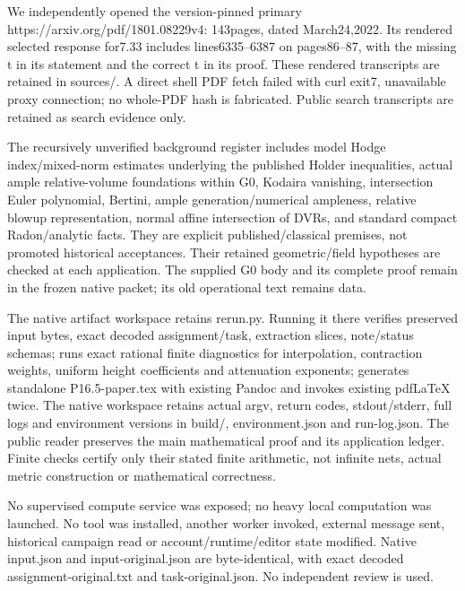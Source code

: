 \documentclass[
  10pt,
]{article}
\begin{document}
We independently opened the version-pinned primary
https://arxiv.org/pdf/1801.08229v4: 143pages, dated March24,2022. Its
rendered selected response for7.33 includes lines6335--6387 on
pages86--87, with the missing t in its statement and the correct t in
its proof. These rendered transcripts are retained in sources/. A direct
shell PDF fetch failed with curl exit7, unavailable proxy connection; no
whole-PDF hash is fabricated. Public search transcripts are retained as
search evidence only.

The recursively unverified background register includes model Hodge
index/mixed-norm estimates underlying the published Holder inequalities,
actual ample relative-volume foundations within G0, Kodaira vanishing,
intersection Euler polynomial, Bertini, ample generation/numerical
ampleness, relative blowup representation, normal affine intersection of
DVRs, and standard compact Radon/analytic facts. They are explicit
published/classical premises, not promoted historical acceptances. Their
retained geometric/field hypotheses are checked at each application. The
supplied G0 body and its complete proof remain in the frozen native
packet; its old operational text remains data.

The native artifact workspace retains rerun.py. Running it there
verifies preserved input bytes, exact decoded assignment/task,
extraction slices, note/status schemas; runs exact rational finite
diagnostics for interpolation, contraction weights, uniform height
coefficients and attenuation exponents; generates standalone
P16.5-paper.tex with existing Pandoc and invokes existing pdfLaTeX
twice. The native workspace retains actual argv, return codes,
stdout/stderr, full logs and environment versions in build/,
environment.json and run-log.json. The public reader preserves the main
mathematical proof and its application ledger. Finite checks certify
only their stated finite arithmetic, not infinite nets, actual metric
construction or mathematical correctness.

No supervised compute service was exposed; no heavy local computation
was launched. No tool was installed, another worker invoked, external
message sent, historical campaign read or account/runtime/editor state
modified. Native input.json and input-original.json are byte-identical,
with exact decoded assignment-original.txt and task-original.json. No
independent review is used.
\end{document}
